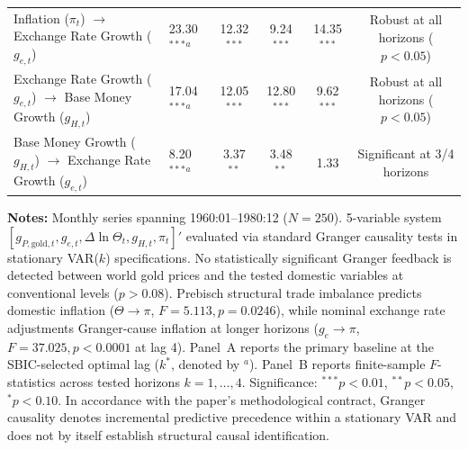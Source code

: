 \begin{table}[htbp]
{\begin{tabular}{llccccc}
Inflation ($\pi_t$) $\to$ Exchange Rate Growth ($g_{e,t}$) & 23.30$^{***}$$^a$ & 12.32$^{***}$ & 9.24$^{***}$ & 14.35$^{***}$ & \multicolumn{2}{c}{Robust at all horizons ($p < 0.05$)} \\
Exchange Rate Growth ($g_{e,t}$) $\to$ Base Money Growth ($g_{H,t}$) & 17.04$^{***}$$^a$ & 12.05$^{***}$ & 12.80$^{***}$ & 9.62$^{***}$ & \multicolumn{2}{c}{Robust at all horizons ($p < 0.05$)} \\
Base Money Growth ($g_{H,t}$) $\to$ Exchange Rate Growth ($g_{e,t}$) & 8.20$^{***}$$^a$ & 3.37$^{**}$ & 3.48$^{**}$ & 1.33 & \multicolumn{2}{c}{Significant at 3/4 horizons} \\
\bottomrule
\end{tabular}%
}
\begin{minipage}{0.96\textwidth}
\vspace{0.3em}
\footnotesize \textbf{Notes:} Monthly series spanning 1960:01--1980:12 ($N=250$). 5-variable system $[g_{P,\text{gold},t}, g_{e,t}, \Delta \ln \Theta_t, g_{H,t}, \pi_t]'$ evaluated via standard Granger causality tests in stationary VAR($k$) specifications. No statistically significant Granger feedback is detected between world gold prices and the tested domestic variables at conventional levels ($p > 0.08$). Prebisch structural trade imbalance predicts domestic inflation ($\Theta \to \pi$, $F = 5.113, p = 0.0246$), while nominal exchange rate adjustments Granger-cause inflation at longer horizons ($g_e \to \pi$, $F = 37.025, p < 0.0001$ at lag 4). Panel~A reports the primary baseline at the SBIC-selected optimal lag ($k^*$, denoted by $^a$). Panel~B reports finite-sample $F$-statistics across tested horizons $k = 1, \dots, 4$. Significance: $^{***} p < 0.01$, $^{**} p < 0.05$, $^{*} p < 0.10$. In accordance with the paper's methodological contract, Granger causality denotes incremental predictive precedence within a stationary VAR and does not by itself establish structural causal identification.
\end{minipage}
\end{table}
